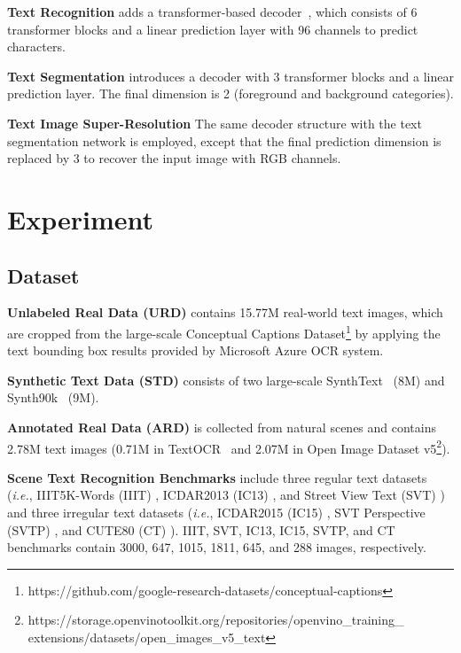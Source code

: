 \documentclass[10pt,twocolumn,letterpaper]{article}
\begin{document}
\noindent \textbf{Text Recognition} adds a transformer-based decoder~\cite{SATRN:lee2020recognizing}, which consists of 6 transformer blocks and a linear prediction layer with 96 channels to predict characters.

\noindent \textbf{Text Segmentation} introduces a decoder with 3 transformer blocks and a linear prediction layer. The final dimension is 2 (foreground and background categories).

\noindent \textbf{Text Image Super-Resolution} The same decoder structure with the text segmentation network is employed, except that the final prediction dimension is replaced by 3 to recover the input image with RGB channels.


\section{Experiment}
\subsection{Dataset}

\noindent \textbf{Unlabeled Real Data (URD)} contains 15.77M real-world text images, which are cropped from the large-scale Conceptual Captions Dataset\footnote[1]{https://github.com/google-research-datasets/conceptual-captions} by applying the text bounding box results provided by Microsoft Azure OCR system.

\noindent \textbf{Synthetic Text Data (STD)} consists of two large-scale SynthText~\cite{ST:gupta2016synthetic} (8M) and Synth90k~\cite{MJ:jaderberg2014synthetic} (9M). 

\noindent \textbf{Annotated Real Data (ARD)} is collected from natural scenes and contains 2.78M text images (0.71M in TextOCR~\cite{TextOCR} and 2.07M in Open Image Dataset v5\footnote[2]{https://storage.openvinotoolkit.org/repositories/openvino\_training\_\\extensions/datasets/open\_images\_v5\_text}). 

\noindent \textbf{Scene Text Recognition Benchmarks} include three regular text datasets (\emph{i.e.}, IIIT5K-Words (IIIT) \cite{IIIT5K:mishra2012scene}, ICDAR2013 (IC13) \cite{IC13:karatzas2013icdar}, and Street View Text (SVT) \cite{SVT:wang2011end}) and three irregular text datasets (\emph{i.e.}, ICDAR2015 (IC15) \cite{IC15:karatzas2015icdar}, SVT Perspective (SVTP) \cite{SP:phan2013recognizing}, and CUTE80 (CT) \cite{CT:risnumawan2014robust}).
IIIT, SVT, IC13, IC15, SVTP, and CT benchmarks contain 3000, 647, 1015, 1811, 645, and 288 images, respectively.
\end{document}
